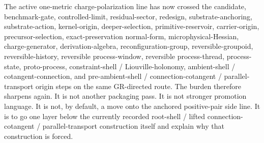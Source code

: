 \documentclass[11pt]{article}
\begin{document}
The active one-metric charge-polarization line has now crossed the candidate, benchmark-gate, controlled-limit, residual-sector, redesign, substrate-anchoring, substrate-action, kernel-origin, deeper-selection, primitive-reservoir, carrier-origin, precursor-selection, exact-preservation normal-form, microphysical-Hessian, charge-generator, derivation-algebra, reconfiguration-group, reversible-groupoid, reversible-history, reversible process-window, reversible process-thread, process-state, proto-process, constraint-shell / Liouville-holonomy, ambient-shell / cotangent-connection, and pre-ambient-shell / connection-cotangent / parallel-transport origin steps on the same GR-directed route. The burden therefore sharpens again. It is not another packaging pass. It is not stronger promotion language. It is not, by default, a move onto the anchored positive-pair side line. It is to go one layer below the currently recorded root-shell / lifted connection-cotangent / parallel-transport construction itself and explain why that construction is forced.
\end{document}
